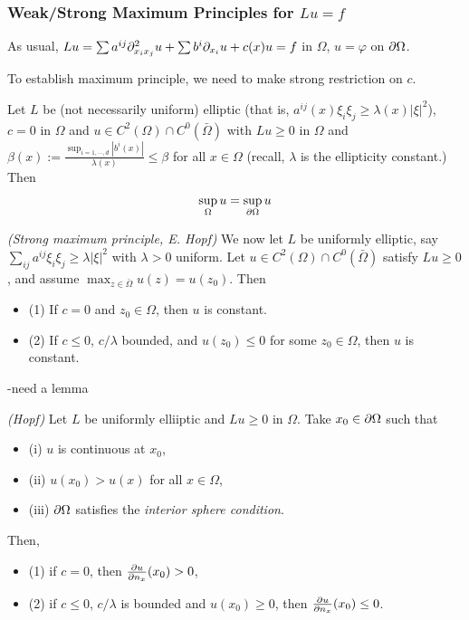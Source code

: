 \documentclass[10pt,a4paper]{article}
\renewenvironment{i}
{\begin{itemize} 
	}%
	{\end{itemize}
}
\begin{document}
\subsubsection*{Weak/Strong Maximum Principles for $Lu =f$}

As usual, $Lu = \sum a^{ij}\partial^2_{x_i x_j} u + \sum b^i \partial_{x_i} u + c(x) u = f$ in $\Omega$, $u=\varphi$ on $\partial \Omega$.
\s

To establish maximum principle, we need to make strong restriction on $c$.
\s

\thm Let $L$ be (not necessarily uniform) elliptic (that is, $a^{ij}(x) \xi_i \xi_j \geq \lambda(x) |\xi|^2$), $c=0$ in $\Omega$ and $u\in C^2(\Omega) \cap C^0(\bar{\Omega})$ with $Lu \geq 0$ in $\Omega$ and $\beta(x) := \frac{\sup_{i=1,\cdots,d} |b^i(x)|}{\lambda (x)} \leq\beta$ for all $x\in \Omega$ (recall, $\lambda$ is the ellipticity constant.) Then
\begin{align*}
\sup_{\Omega} u = \sup_{\partial \Omega} u
\end{align*}
\s

\thm \emph{(Strong maximum principle, E. Hopf)}  We now let $L$ be uniformly elliptic, say $\sum_{ij} a^{ij} \xi_i \xi_j \geq \lambda |\xi|^2$ with $\lambda>0$ uniform. Let $u\in C^2(\Omega) \cap C^0(\bar{\Omega})$ satisfy $Lu \geq 0$, and assume $\max_{z\in \bar{\Omega}} u(z) = u(z_0)$. Then
\begin{i}
\item[(1)] If $c=0$ and $z_0 \in \Omega$, then $u$ is constant.
\item[(2)] If $c\leq 0$, $c/\lambda$ bounded, and $u(z_0) \leq 0$ for some $z_0 \in \Omega$, then $u$ is constant.
\end{i}
-need a lemma
\s

\lem \emph{(Hopf)} Let $L$ be uniformly elliiptic and $Lu \geq 0$ in $\Omega$. Take $x_0 \in \partial\Omega$ such that
\begin{i}
\item[(i)] $u$ is continuous at $x_0$,
\item[(ii)] $u(x_0) > u(x)$ for all $x\in \Omega$,
\item[(iii)] $\partial \Omega$ satisfies the \emph{interior sphere condition}.
\end{i}
Then,
\begin{i}
\item[(1)] if $c=0$, then $\frac{\partial u}{\partial n_x} (x_0) >0$,
\item[(2)] if $c\leq 0$, $c/\lambda$ is bounded and $u(x_0) \geq 0$, then $\frac{\partial u}{\partial n_x}(x_0) \leq 0$.
\end{i}
\s
\end{document}
